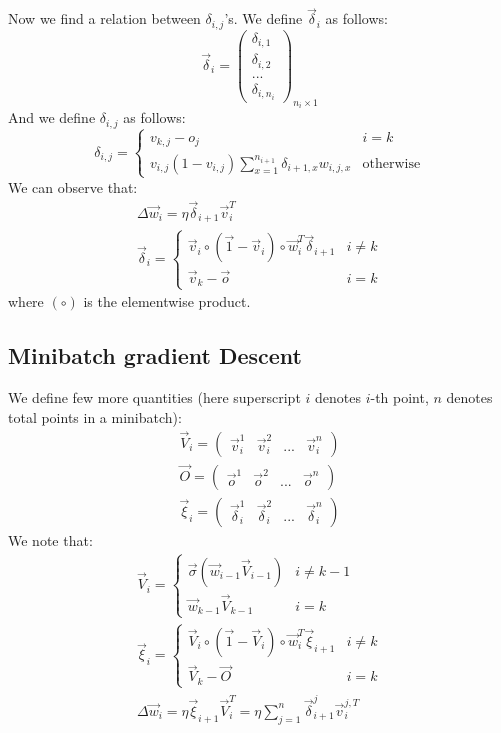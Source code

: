 \documentclass{article}
\begin{document}
Now we find a relation between $\delta_{i,j}$'s. We define $\vec \delta_i$ as follows:
$$\vec \delta_i=\begin{pmatrix}\delta_{i,1}\\\delta_{i,2}\\...\\\delta_{i,n_i}\end{pmatrix}_{n_i\times 1}$$
And we define $\delta_{i,j}$ as follows:
$$\delta_{i,j}=\begin{cases}v_{k,j}-o_j&i=k\\\displaystyle v_{i,j}(1-v_{i,j})\sum_{x=1}^{n_{i+1}}\delta_{i+1,x}w_{i,j,x}&\text{otherwise}\end{cases}$$
We can observe that:
\begin{gather*}\Delta\vec w_{i}=\eta \vec \delta_{i+1}\vec v_{i}^T\\
\vec\delta_i=\begin{cases}\vec v_i \circ (\vec 1-\vec v_i)\circ \vec w_i^T\vec \delta_{i+1}&i\ne k\\\vec v_k-\vec o&i=k\end{cases}
\end{gather*}
where $(\circ)$ is the elementwise product.
\subsection{Minibatch gradient Descent}
We define few more quantities (here superscript $i$ denotes $i$-th point, $n$ denotes total points in a minibatch):
\begin{gather*}
\vec V_i = \begin{pmatrix}\vec v_i^1&\vec v_i^2&...&\vec v_i^n\end{pmatrix}\\
\vec O = \begin{pmatrix}\vec o^1&\vec o^2&...&\vec o^n\end{pmatrix}\\
\vec \xi_i =\begin{pmatrix}\vec \delta_i^1&\vec \delta_i^2&...&\vec \delta_i^n\end{pmatrix}
\end{gather*}
We note that:
\begin{gather*}
\vec V_i = \begin{cases}\vec \sigma (\vec w_{i-1}\vec V_{i-1})&i\ne k-1\\ \vec w_{k-1}\vec V_{k-1}&i=k\end{cases}\\
\vec \xi_i = \begin{cases}\vec V_i\circ (\vec 1-\vec V_i)\circ\vec w_i^T\vec \xi_{i+1}&i\ne k\\\vec V_k-\vec O&i=k\end{cases}\\
\Delta \vec w_i = \eta\vec \xi_{i+1} \vec V_{i}^T=\eta \sum_{j=1}^n\vec \delta_{i+1}^j\vec v_i^{j,T}
\end{gather*}
\end{document}

